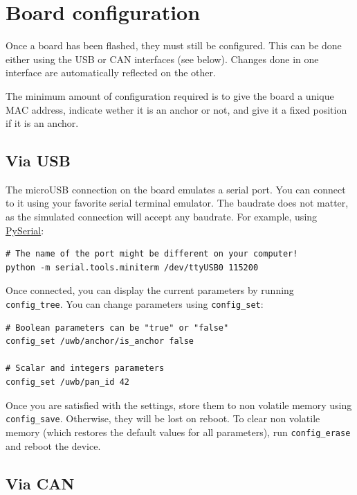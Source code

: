 \section{Board configuration}\label{board-configuration}

Once a board has been flashed, they must still be configured. This can
be done either using the USB or CAN interfaces (see below). Changes done
in one interface are automatically reflected on the other.

The minimum amount of configuration required is to give the board a
unique MAC address, indicate wether it is an anchor or not, and give it
a fixed position if it is an anchor.

\subsection{Via USB}\label{via-usb}

The microUSB connection on the board emulates a serial port. You can
connect to it using your favorite serial terminal emulator. The baudrate
does not matter, as the simulated connection will accept any baudrate.
For example, using \href{https://pythonhosted.org/pyserial/}{PySerial}:

\begin{verbatim}
# The name of the port might be different on your computer!
python -m serial.tools.miniterm /dev/ttyUSB0 115200
\end{verbatim}

Once connected, you can display the current parameters by running
\texttt{config\_tree}. You can change parameters using
\texttt{config\_set}:

\begin{verbatim}
# Boolean parameters can be "true" or "false"
config_set /uwb/anchor/is_anchor false

# Scalar and integers parameters
config_set /uwb/pan_id 42
\end{verbatim}

Once you are satisfied with the settings, store them to non volatile
memory using \texttt{config\_save}. Otherwise, they will be lost on
reboot. To clear non volatile memory (which restores the default values
for all parameters), run \texttt{config\_erase} and reboot the device.

\subsection{Via CAN}\label{via-can}

